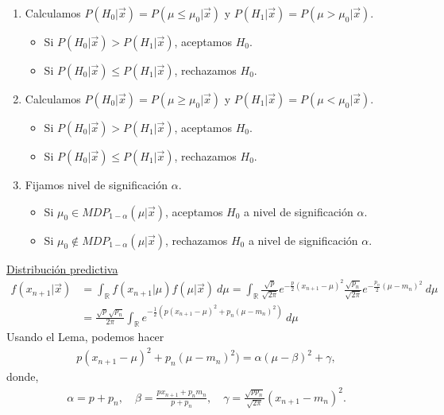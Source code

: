 \begin{enumerate}
    \item Calculamos $P(H_0 | \vec{x}) = P(\mu\leq \mu_0 |\vec{x})$ y $P(H_1 | \vec{x}) = P(\mu> \mu_0 | \vec{x})$.
          \begin{itemize}
              \item Si $P(H_0 | \vec{x}) > P(H_1 | \vec{x})$, aceptamos $H_0$.
              \item Si $P(H_0 | \vec{x}) \leq P(H_1 | \vec{x})$, rechazamos $H_0$.
          \end{itemize}
    \item Calculamos $P(H_0 | \vec{x}) = P(\mu \ge \mu_0 |\vec{x})$ y $P(H_1 | \vec{x}) = P(\mu < \mu_0 | \vec{x})$.
          \begin{itemize}
              \item Si $P(H_0 | \vec{x}) > P(H_1 | \vec{x})$, aceptamos $H_0$.
              \item Si $P(H_0 | \vec{x}) \leq P(H_1 | \vec{x})$, rechazamos $H_0$.
          \end{itemize}
    \item Fijamos nivel de significación $\alpha$.
          \begin{itemize}
              \item Si $\mu_0 \in MDP_{1 - \alpha}(\mu | \vec{x})$, aceptamos $H_0$ a nivel de significación $\alpha$.
              \item Si $\mu_0 \not\in MDP_{1 - \alpha}(\mu| \vec{x})$, rechazamos $H_0$ a nivel de significación $\alpha$.
          \end{itemize}
\end{enumerate}
\underline{Distribución predictiva}
\begin{align*}
    f(x_{n+1} | \vec{x}) & = \int_{\mathbb{R}} f(x_{n+1} | \mu) f(\mu | \vec{x}) \ d\mu = \int_{\mathbb{R}} \frac{\sqrt{p}}{\sqrt{2\pi}}e^{-\frac{p}{2}(x_{n+1} - \mu)^2} \frac{\sqrt{p_n}}{\sqrt{2\pi}} e^{-\frac{p_n}{2}(\mu - m_n)^2} \ d\mu \\
                         & = \frac{\sqrt{p}\sqrt{p_n}}{2\pi} \int_{\mathbb{R}} e^{-\frac{1}{2}(p(x_{n+1} - \mu)^2 + p_n(\mu - m_n)^2)} \ d\mu
\end{align*}
Usando el Lema, podemos hacer
\begin{align*}
    p(x_{n+1} - \mu)^2 + p_n(\mu - m_n)^2) = \alpha(\mu- \beta)^2 + \gamma,
\end{align*}
donde,
\begin{align*}
    \alpha = p + p_n, \quad \beta = \frac{px_{n+1} + p_nm_n}{p+p_n}, \quad \gamma = \frac{\sqrt{pp_n}}{\sqrt{2\pi}}(x_{n+1} - m_n)^2.
\end{align*}
